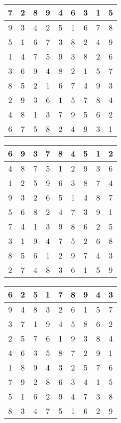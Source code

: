 \documentclass[]{article}
\begin{document}
\begin{table}[]
\begin{tabular}{c|c|c|c|c|c|c|c|c}
7 & 2 & 8 & 9 & 4 & 6 & 3 & 1 & 5 \\\hline
9 & 3 & 4 & 2 & 5 & 1 & 6 & 7 & 8 \\\hline
5 & 1 & 6 & 7 & 3 & 8 & 2 & 4 & 9 \\\hline
1 & 4 & 7 & 5 & 9 & 3 & 8 & 2 & 6 \\\hline
3 & 6 & 9 & 4 & 8 & 2 & 1 & 5 & 7 \\\hline
8 & 5 & 2 & 1 & 6 & 7 & 4 & 9 & 3 \\\hline
2 & 9 & 3 & 6 & 1 & 5 & 7 & 8 & 4 \\\hline
4 & 8 & 1 & 3 & 7 & 9 & 5 & 6 & 2 \\\hline
6 & 7 & 5 & 8 & 2 & 4 & 9 & 3 & 1 
\end{tabular}
\end{table}
\begin{table}[]
\begin{tabular}{c|c|c|c|c|c|c|c|c}
6 & 9 & 3 & 7 & 8 & 4 & 5 & 1 & 2 \\\hline
4 & 8 & 7 & 5 & 1 & 2 & 9 & 3 & 6 \\\hline
1 & 2 & 5 & 9 & 6 & 3 & 8 & 7 & 4 \\\hline
9 & 3 & 2 & 6 & 5 & 1 & 4 & 8 & 7 \\\hline
5 & 6 & 8 & 2 & 4 & 7 & 3 & 9 & 1 \\\hline
7 & 4 & 1 & 3 & 9 & 8 & 6 & 2 & 5 \\\hline
3 & 1 & 9 & 4 & 7 & 5 & 2 & 6 & 8 \\\hline
8 & 5 & 6 & 1 & 2 & 9 & 7 & 4 & 3 \\\hline
2 & 7 & 4 & 8 & 3 & 6 & 1 & 5 & 9 
\end{tabular}
\end{table}
\begin{table}[]
\begin{tabular}{c|c|c|c|c|c|c|c|c}
6 & 2 & 5 & 1 & 7 & 8 & 9 & 4 & 3 \\\hline
9 & 4 & 8 & 3 & 2 & 6 & 1 & 5 & 7 \\\hline
3 & 7 & 1 & 9 & 4 & 5 & 8 & 6 & 2 \\\hline
2 & 5 & 7 & 6 & 1 & 9 & 3 & 8 & 4 \\\hline
4 & 6 & 3 & 5 & 8 & 7 & 2 & 9 & 1 \\\hline
1 & 8 & 9 & 4 & 3 & 2 & 5 & 7 & 6 \\\hline
7 & 9 & 2 & 8 & 6 & 3 & 4 & 1 & 5 \\\hline
5 & 1 & 6 & 2 & 9 & 4 & 7 & 3 & 8 \\\hline
8 & 3 & 4 & 7 & 5 & 1 & 6 & 2 & 9 
\end{tabular}
\end{table}
\end{document}
